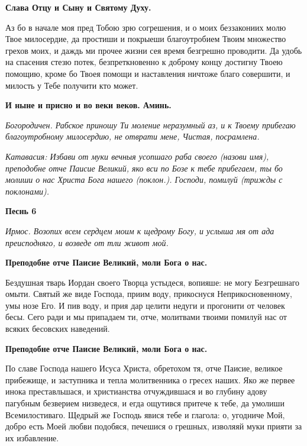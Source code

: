 \bfseries Слава Отцу и Сыну и Святому Духу.\normalfont{} 




Аз бо в начале моя пред Тобою зрю согрешения, и о моих беззакониих молю Твое милосердие, да простиши и покрыеши благоутробием Твоим множество грехов моих, и даждь ми прочее жизни сея время безгрешно проводити. Да удобь на спасения стезю потек, безпреткновенно к доброму концу достигну Твоею помощию, кроме бо Твоея помощи и наставления ничтоже благо совершити, и милость у Тебе получити кто может. 




\bfseries И ныне и присно и во веки веков. Аминь.\normalfont{} 




\itshape Богородичен.\normalfont{} Рабское приношу Ти моление неразумный аз, и к Твоему прибегаю благоутробному милосердию, не отврати мене, Чистая, посрамлена. 




\itshape Катавасия:\normalfont{} Избави от муки вечныя усопшаго раба своего (\itshape назови имя\normalfont{}), преподобне отче Паисие Великий, яко вси по Бозе к тебе прибегаем, ты бо молиши о нас Христа Бога нашего (\itshape поклон.\normalfont{}). Господи, помилуй (\itshape трижды с поклонами\normalfont{}). 




\bfseries Песнь 6\normalfont{} 




\itshape Ирмос.\normalfont{} Возопих всем сердцем моим к щедрому Богу, и услыша мя от ада преисподняго, и возведе от тли живот мой. 




\bfseries Преподобне отче Паисие Великий, моли Бога о нас.\normalfont{} 




Бездушная тварь Иордан своего Творца устыдеся, вопияше: не могу Безгрешнаго омыти. Святый же виде Господа, приим воду, прикоснуся Неприкосновенному, умы нозе Его. И пив воду, и прия дар целити недуги и прогонити от человек бесы. Сего ради и мы припадаем ти, отче, молитвами твоими помилуй нас от всяких бесовских наведений. 




\bfseries Преподобне отче Паисие Великий, моли Бога о нас.\normalfont{} 




По славе Господа нашего Исуса Христа, обретохом тя, отче Паисие, великое прибежище, и заступника и тепла молитвенника о гресех наших. Яко же первее инока преставльшася, и христианства отчуждившася и во глубину адову пагубным безверием низведеся, и егда ощутився притече к тебе, да умолиши Всемилостиваго. Щедрый же Господь явися тебе и глагола: о, угодниче Мой, добро есть Моей любви подобяся, печешися о грешных, изволяяй муки прияти за их избавление. 




